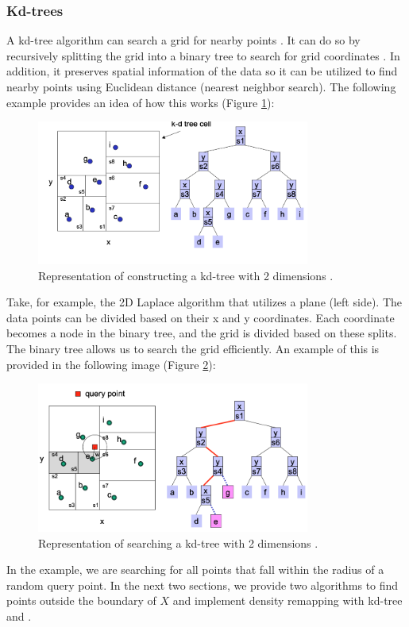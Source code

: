 \subsubsection*{Kd-trees} \label{theory:kd-trees}
A kd-tree algorithm can search a grid for nearby points \citep{bentley_multidimensional_1975}.
It can do so by recursively splitting the grid into a binary tree to search for grid coordinates \citep{washington_k-d_2002}.
In addition, it preserves spatial information of the data so it can be utilized to find nearby points using Euclidean distance (nearest neighbor search).
The following example provides an idea of how this works (Figure \ref{fig:kd-tree-theory}):
\begin{figure}[H]
  \includegraphics[width=0.8\textwidth]{TheorethicalFramework/ND-Laplace/Images/kd-tree-part1.png}
  \caption{Representation of constructing a kd-tree with 2 dimensions \citep{washington_k-d_2002}.}
  \label{fig:kd-tree-theory}
\end{figure}
Take, for example, the 2D Laplace algorithm that utilizes a plane (left side).
The data points can be divided based on their x and y coordinates.
Each coordinate becomes a node in the binary tree, and the grid is divided based on these splits.
The binary tree allows us to search the grid efficiently.
An example of this is provided in the following image (Figure \ref{fig:kd-tree-searching-theory}):
\begin{figure}[H]
  \includegraphics[width=0.8\textwidth]{TheorethicalFramework/ND-Laplace/Images/kd-tree-part2.png}
  \caption{Representation of searching a kd-tree with 2 dimensions \citep{washington_k-d_2002}.}
  \label{fig:kd-tree-searching-theory}
\end{figure}
In the example, we are searching for all points that fall within the radius of a random query point.
In the next two sections, we provide two algorithms to find points outside the boundary of $X$ and implement density remapping with kd-tree and .

